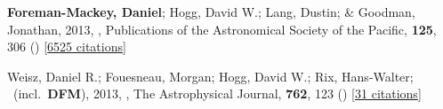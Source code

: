 \item[{\color{numcolor}\scriptsize2}] \textbf{Foreman-Mackey, Daniel}; Hogg, David W.; Lang, Dustin; \& Goodman, Jonathan, 2013, , Publications of the Astronomical Society of the Pacific, \textbf{125}, 306 () [\href{https://ui.adsabs.harvard.edu/abs/2013PASP..125..306F}{6525 citations}]

\item[{\color{numcolor}\scriptsize1}] Weisz, Daniel R.; Fouesneau, Morgan; Hogg, David W.; Rix, Hans-Walter; \etal\ (incl.\ \textbf{DFM}), 2013, , The Astrophysical Journal, \textbf{762}, 123 () [\href{https://ui.adsabs.harvard.edu/abs/2013ApJ...762..123W}{31 citations}]